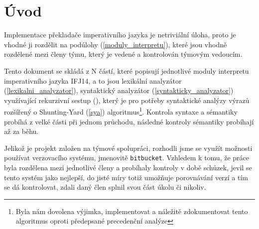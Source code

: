 \documentclass[12pt,a4paper,titlepage,final]{article}
\begin{document}

\def\author{Antonín Marko}
\def\email{xmarko07@stud.fit.vutbr.cz}
\def\projname{Implementace interpretu imperativního jazyka IFJ14}



\pagestyle{plain}
\setcounter{page}{1}
\tableofcontents

\newpage
\pagestyle{plain}
\setcounter{page}{1}

\section{Úvod} \label{uvod}
Implementace překladače imperativního jazyka je netriviální úloha, proto je
vhodné ji rozdělit na podúlohy (\ref{moduly_interpretu}), které jsou vhodně
rozdělené mezi členy týmu, který je vedené a kontrolován týmovým vedoucím.

Tento dokument se skládá z N částí, které popisují jednotlivé moduly
interpretu imperativního jazyka IFJ14, a to jsou lexikální analyzátor
(\ref{lexikalni_analyzator}), syntaktický analyzátor (\ref{syntakticky_analyzator})
využívající rekurzivní sestup (), který je pro potřeby syntaktické
analýzy výrazů rozšířený o Shunting-Yard (\ref{sya}) algoritmus\footnote{Byla nám
dovolena výjimka, implementovat a náležitě zdokumentovat tento algoritmus oproti předepsané
precedenční analýze}. Kontrola syntaxe a sémantiky probíhá z velké části při jednom
průchodu, následné kontroly sémantiky probíhají až za běhu.

Jelikož je projekt založen na týmové spolupráci, rozhodli jsme se využít možnosti používat verzovacího systému, jmenovitě \verb|bitbucket|. Vzhledem k tomu, že práce byla rozdělena mezi jednotlivé členy a probíhaly kontroly v době schůzek, jevil se tento systém jako nejlepší, do jisté míry totiž umožňuje porovnávání verzí a tím se dá kontrolovat, zdali daný člen splnil svou část úkolu či nikoliv.
\end{document}
